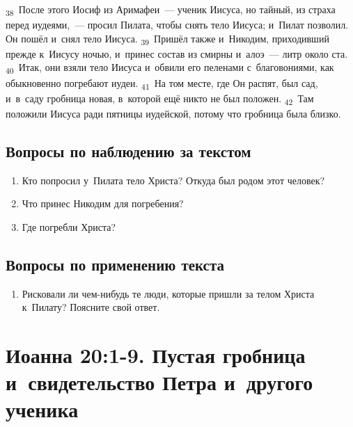 \documentclass[a4paper,12pt]{article}
\begin{document}
\textsubscript{38}~После этого Иосиф из Аримафеи~--- ученик Иисуса, но тайный, из страха перед иудеями,~--- просил Пилата, чтобы снять тело Иисуса; и~Пилат позволил. Он пошёл и~снял тело Иисуса.
\textsubscript{39}~Пришёл также и~Никодим, приходивший прежде к~Иисусу ночью, и~принес состав из смирны и~алоэ~--- литр около ста.
\textsubscript{40}~Итак, они взяли тело Иисуса и~обвили его пеленами с~благовониями, как обыкновенно погребают иудеи.
\textsubscript{41}~На том месте, где Он распят, был сад, и~в~саду гробница новая, в~которой ещё никто не был положен.
\textsubscript{42}~Там положили Иисуса ради пятницы иудейской, потому что гробница была близко.

\subsection*{Вопросы по наблюдению за текстом}
\begin{enumerate}
    \item Кто попросил у~Пилата тело Христа? Откуда был родом этот человек? 
    
    \myline
    
    \myline
    \item Что принес Никодим для погребения? 
    
    \myline
    
    \myline
    \item Где погребли Христа? 
    
    \myline
    
    \myline
\end{enumerate}

\subsection*{Вопросы по применению текста} 
\begin{enumerate}
    \item Рисковали ли чем-нибудь те люди, которые пришли за телом Христа к~Пилату? Поясните свой ответ. 
    
    \myline
    
    \myline
\end{enumerate}



\section{Иоанна 20:1-9. Пустая гробница и~свидетельство Петра и~другого ученика}
\end{document}
